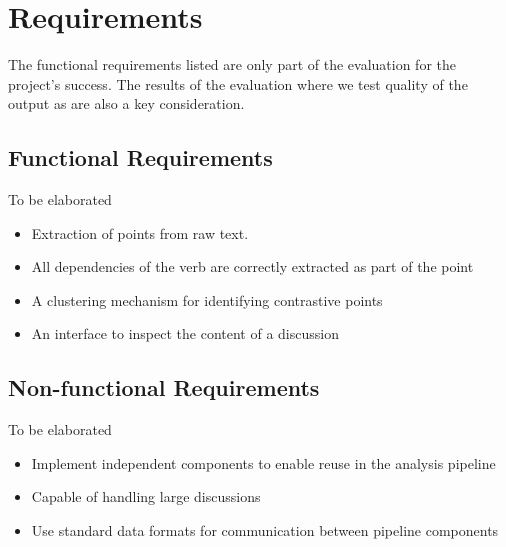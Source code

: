 \chapter{Requirements\label{chap:requirements}}
  The functional requirements listed are only part of the evaluation for the project's success. The results of the evaluation where we test quality of the output as are also a key consideration.
  \section{Functional Requirements}
    To be elaborated
    \begin{itemize}
      \item{Extraction of points from raw text.}
      \item{All dependencies of the verb are correctly extracted as part of the point}
      \item{A clustering mechanism for identifying contrastive points}
      \item{An interface to inspect the content of a discussion}
    \end{itemize}
  \section{Non-functional Requirements}
    To be elaborated
    \begin{itemize}
      \item{Implement independent components to enable reuse in the analysis pipeline}
      \item{Capable of handling large discussions}
      \item{Use standard data formats for communication between pipeline components}
    \end{itemize}
